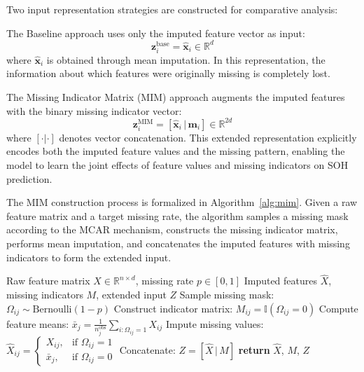 \documentclass[5p,times]{elsarticle}
\begin{document}
Two input representation strategies are constructed for comparative analysis:

The Baseline approach uses only the imputed feature vector as input:
\begin{equation}
    \mathbf{z}_i^{\text{base}} = \hat{\mathbf{x}}_i \in \mathbb{R}^{d}
\end{equation}
where $\hat{\mathbf{x}}_i$ is obtained through mean imputation. In this representation, the information about which features were originally missing is completely lost.

The Missing Indicator Matrix (MIM) approach augments the imputed features with the binary missing indicator vector:
\begin{equation}
    \mathbf{z}_i^{\text{MIM}} = [\hat{\mathbf{x}}_i \,|\, \mathbf{m}_i] \in \mathbb{R}^{2d}
\end{equation}
where $[\cdot|\cdot]$ denotes vector concatenation. This extended representation explicitly encodes both the imputed feature values and the missing pattern, enabling the model to learn the joint effects of feature values and missing indicators on SOH prediction.

The MIM construction process is formalized in Algorithm~\ref{alg:mim}. Given a raw feature matrix and a target missing rate, the algorithm samples a missing mask according to the MCAR mechanism, constructs the missing indicator matrix, performs mean imputation, and concatenates the imputed features with missing indicators to form the extended input.

\begin{algorithm}[!htb]
\caption{MIM Input Construction}
\label{alg:mim}
\begin{algorithmic}[1]
\REQUIRE Raw feature matrix $X \in \mathbb{R}^{n \times d}$, missing rate $p \in [0, 1]$
\ENSURE Imputed features $\hat{X}$, missing indicators $M$, extended input $Z$
\STATE Sample missing mask: $\Omega_{ij} \sim \text{Bernoulli}(1-p)$
\STATE Construct indicator matrix: $M_{ij} = \mathbb{I}(\Omega_{ij} = 0)$
\STATE Compute feature means: $\bar{x}_j = \frac{1}{n_j^{\text{obs}}} \sum_{i: \Omega_{ij}=1} X_{ij}$
\STATE Impute missing values: $\hat{X}_{ij} = \begin{cases} X_{ij}, & \text{if } \Omega_{ij}=1 \\ \bar{x}_j, & \text{if } \Omega_{ij}=0 \end{cases}$
\STATE Concatenate: $Z = [\hat{X} \,|\, M]$
\STATE \textbf{return} $\hat{X}$, $M$, $Z$
\end{algorithmic}
\end{algorithm}
\end{document}
